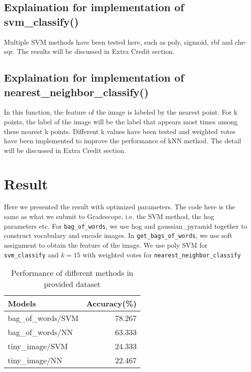 \subsection*{Explaination for implementation of svm\_classify()}

Multiple SVM methods have been tested here, such as poly, sigmoid, rbf and che-sqr. The results will be discussed in Extra Credit section.

\subsection*{Explaination for implementation of nearest\_neighbor\_classify()}

In this function, the feature of the image is labeled by the nearest point. For k points, the label of the image will be the label that appears most times among these nearest k points. Different k values have been tested and weighted votes have been implemented to improve the performance of kNN method. The detail will be discussed in Extra Credit section.

\section*{Result}

Here we presented the result with optimized parameters. The code here is the same as what we submit to Gradescope, i.e. the SVM method, the hog parameters etc. For \verb|bag_of_words|, we use hog and gaussian\_pyramid together to construct vocabulary and encode images. In \verb|get_bags_of_words|, we use soft assignment to obtain the feature of the image. We use poly SVM for \verb|svm_classify| and $k=15$ with weighted votes for \verb|nearest_neighbor_classify|

\begin{table}[h]
    \centering
    \begin{tabular}{lr}
        \toprule
        Models             & Accuracy(\%) \\
        \midrule
        bag\_of\_words/SVM & 78.267       \\
        bag\_of\_words/NN  & 63.333       \\
        tiny\_image/SVM    & 24.333       \\
        tiny\_image/NN     & 22.467       \\
        \bottomrule
    \end{tabular}
    \caption{Performance of different methods in provided dataset}
    \label{acc}
\end{table}


